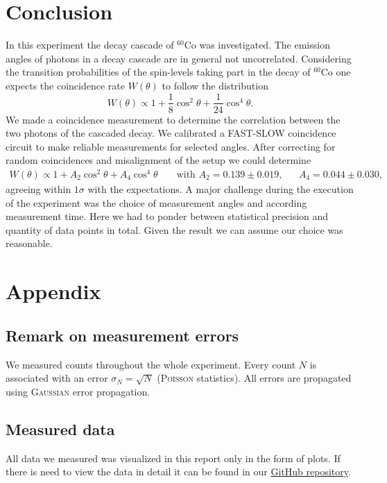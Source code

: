 \documentclass[11pt,a4paper,notitlepage]{scrartcl}
\begin{document}
\newpage

\section{Conclusion}
In this experiment the decay cascade of $^{60}$Co was investigated. The emission angles of photons in a decay cascade are in general not uncorrelated. Considering the transition probabilities of the spin-levels taking part in the decay of $^{60}$Co one expects the coincidence rate $W(\theta)$ to follow the distribution $$W(\theta)\propto 1+\frac{1}{8}\cos^2\theta+\frac{1}{24}\cos^4\theta.$$   We made a coincidence measurement to determine the correlation between the two photons of the cascaded decay. We calibrated a FAST-SLOW coincidence circuit to make reliable measurements for selected angles. After correcting for random coincidences and misalignment of the setup we could determine \begin{align*}
	W(\theta)\propto 1+A_2\cos^2\theta+A_4\cos^4\theta &&\text{ with } A_2=0.139\pm0.019,&&A_4=0.044\pm0.030,
\end{align*}
agreeing within $1\sigma$ with the expectations. A major challenge during the execution of the experiment was the choice of measurement angles and according measurement time. Here we had to ponder between statistical precision and quantity of data points in total. Given the result we can assume our choice was reasonable. 
\label{sec:conc}

\appendix
\newpage
\section{Appendix}

\subsection{Remark on measurement errors}
We measured counts throughout the whole experiment. Every count $N$ is associated with an error $\sigma_N=\sqrt{N}$ (\textsc{Poisson} statistics). All errors are propagated using \textsc{Gaussian} error propagation.

\subsection{Measured data}
All data we measured was visualized in this report only in the form of plots. If there is need to view the data in detail it can be found in our \href{https://github.com/krausejm/advanced_lab_course}{GitHub repository}. 

\newpage
\printbibliography[heading=bibintoc]
\end{document}
